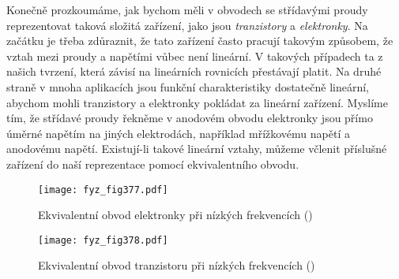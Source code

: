 {  Konečně prozkoumáme, jak bychom měli v obvodech se střídavými proudy reprezentovat taková složitá 
  zařízení, jako jsou \emph{tranzistory} a \emph{elektronky}. Na začátku je třeba zdůraznit, že 
  tato zařízení často pracují takovým způsobem, že vztah mezi proudy a napětími vůbec není 
  lineární. V takových případech ta z našich tvrzení, která závisí na lineárních rovnicích 
  přestávají platit. Na druhé straně v mnoha aplikacích jsou funkční charakteristiky dostatečně 
  lineární, abychom mohli tranzistory a elektronky pokládat za lineární zařízení. Myslíme tím, že 
  střídavé proudy řekněme v anodovém obvodu elektronky jsou přímo úměrné napětím na jiných 
  elektrodách, například mřížkovému napětí a anodovému napětí. Existují-li takové lineární vztahy, 
  můžeme včlenit příslušné zařízení do naší reprezentace pomocí ekvivalentního obvodu.

  \begin{figure}[ht!] %
    \centering
    \texttt{[image: fyz\_fig377.pdf]}
    \caption{Ekvivalentní obvod elektronky při nízkých frekvencích
             (\cite[s.~415]{Feynman02})}
    \label{fyz:fig377}
  \end{figure}

  \begin{figure}[ht!] %
    \centering
    \texttt{[image: fyz\_fig378.pdf]}
    \caption{Ekvivalentní obvod tranzistoru při nízkých frekvencích
             (\cite[s.~415]{Feynman02})}
    \label{fyz:fig378}
  \end{figure}
  
}
